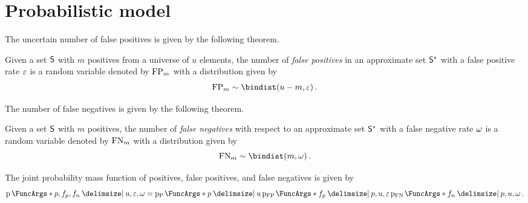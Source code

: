 \documentclass[ ../main.tex]{subfiles}
\begin{document}
\section{Probabilistic model}
\label{sec:prob_model}
The uncertain number of false positives is given by the following theorem.
\begin{theorem}
\label{thm:fpbinom}
Given a set $\Set{S}$ with $m$ positives from a universe of $u$ elements, the number of \emph{false positives} in an approximate set $\ASet{S}$ with a false positive rate $\varepsilon$ is a random variable denoted by $\mathrm{FP}_m$ with a distribution given by
\begin{equation}
    \FP_m \sim \bindist(u - m, \fprate)\,.
\end{equation}
\end{theorem}

The number of false negatives is given by the following theorem.
\begin{theorem}
\label{thm:fnbinom}
Given a set $\Set{S}$ with $m$ positives, the number of \emph{false negatives} with respect to an approximate set $\ASet{S}$ with a false negative rate $\omega$ is a random variable denoted by $\mathrm{FN}_m$ with a distribution given by
\begin{equation}
    \FN_m \sim \bindist(m, \fnrate)\,.
\end{equation}
\end{theorem}

The joint probability mass function of positives, false positives, and false negatives is given by
\begin{equation}
    \PDF{p, f_p, f_n \Given u, \fprate, \fnrate} = \PDF{p \Given u}[\RV{P}] \PDF{f_p \Given p, u, \fprate}[\FP] \PDF{f_n \Given p, u, \fnrate}[\FN]\,.
\end{equation}
\end{document}
